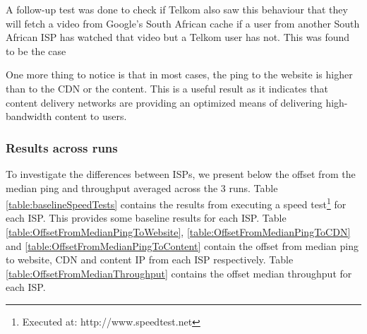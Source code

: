 \documentclass{sig-alternate-05-2015}
\begin{document}
A follow-up test was done to check if Telkom also saw this behaviour that they will fetch a video from Google's South African cache if a user from another South African ISP has watched that video but a Telkom user has not. This was found to be the case

One more thing to notice is that in most cases, the ping to the website is higher than to the CDN or the content. This is a useful result as it indicates that content delivery networks are providing an optimized means of delivering high-bandwidth content to users.

\subsubsection{Results across runs}
To investigate the differences between ISPs, we present below the offset from the median ping and throughput averaged across the 3 runs. Table \ref{table:baselineSpeedTests} contains the results from executing a speed test\footnote{Executed at: http://www.speedtest.net} for each ISP. This provides some baseline results for each ISP. Table \ref{table:OffsetFromMedianPingToWebsite}, \ref{table:OffsetFromMedianPingToCDN} and \ref{table:OffsetFromMedianPingToContent} contain the offset from median ping to website, CDN and content IP from each ISP respectively. Table \ref{table:OffsetFromMedianThroughput} contains the offset median throughput for each ISP.

\begin{table}
	\caption{Baseline speed test for each ISP}
	\label{table:baselineSpeedTests}
\end{table}
\end{document}

